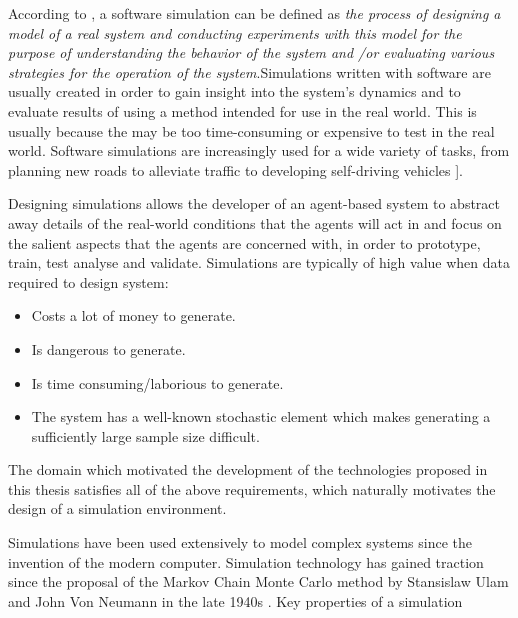 According to \citeauthor{Shannon1998INTRODUCTIONSIMULATION}, a software simulation can be defined as \textit{ the process of designing
a model of a real system and conducting experiments with
this model for the purpose of understanding the behavior of
the system and /or evaluating various strategies for the
operation of the system}.Simulations written with software are usually created in order to gain insight into the system's dynamics and to evaluate results of using a method intended for use in the real world. This is usually because the may be too time-consuming or expensive to test in the real world. Software simulations are increasingly used for a wide variety of tasks, from planning new roads to alleviate traffic \cite{Pell2017TrendsSimulation} to developing self-driving vehicles \cite{Dosovitskiy2017CARLA:Simulator}]. 

Designing simulations allows the developer of an agent-based system to abstract away details of the real-world conditions that the agents will act in and focus on the salient aspects that the agents are concerned with, in order to prototype, train, test analyse and validate. Simulations are typically of high value when data required to design system:
\begin{itemize}
    \item Costs a lot of money to generate.
    \item Is dangerous to generate.
    \item Is time consuming/laborious to generate.
    \item The system has a well-known stochastic element which makes generating a sufficiently large sample size difficult.
\end{itemize}
The domain which motivated the development of the technologies proposed in this thesis satisfies all of the above requirements, which naturally motivates the design of a simulation environment. \par

Simulations have been used extensively to model complex systems since the invention of the modern computer. Simulation technology has gained traction since the proposal of the Markov Chain Monte Carlo method by Stansislaw Ulam and John Von Neumann in the late 1940s \cite{Robert2011AIncomplete}. Key properties of a simulation 

